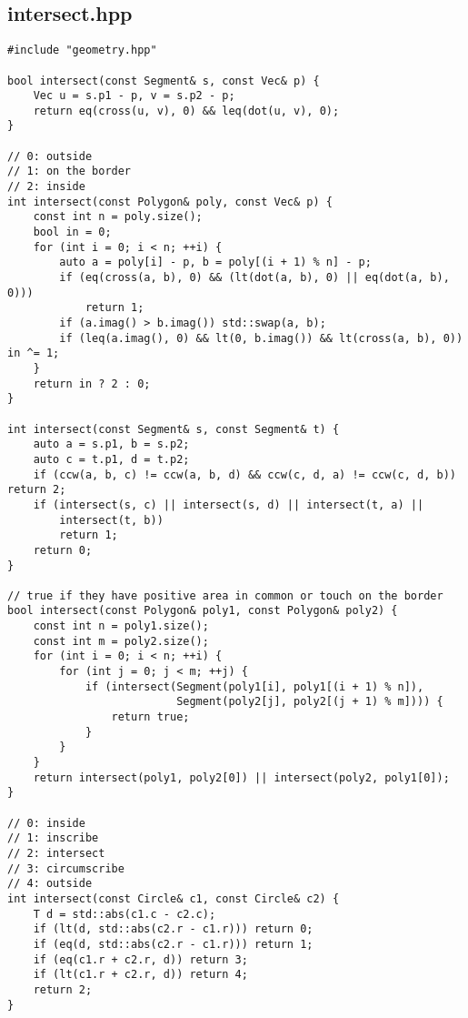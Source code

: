 \subsection{intersect.hpp}

\begin{small}
\begin{markdown}

\end{markdown}
\end{small}

\begin{lstlisting}
#include "geometry.hpp"

bool intersect(const Segment& s, const Vec& p) {
    Vec u = s.p1 - p, v = s.p2 - p;
    return eq(cross(u, v), 0) && leq(dot(u, v), 0);
}

// 0: outside
// 1: on the border
// 2: inside
int intersect(const Polygon& poly, const Vec& p) {
    const int n = poly.size();
    bool in = 0;
    for (int i = 0; i < n; ++i) {
        auto a = poly[i] - p, b = poly[(i + 1) % n] - p;
        if (eq(cross(a, b), 0) && (lt(dot(a, b), 0) || eq(dot(a, b), 0)))
            return 1;
        if (a.imag() > b.imag()) std::swap(a, b);
        if (leq(a.imag(), 0) && lt(0, b.imag()) && lt(cross(a, b), 0)) in ^= 1;
    }
    return in ? 2 : 0;
}

int intersect(const Segment& s, const Segment& t) {
    auto a = s.p1, b = s.p2;
    auto c = t.p1, d = t.p2;
    if (ccw(a, b, c) != ccw(a, b, d) && ccw(c, d, a) != ccw(c, d, b)) return 2;
    if (intersect(s, c) || intersect(s, d) || intersect(t, a) ||
        intersect(t, b))
        return 1;
    return 0;
}

// true if they have positive area in common or touch on the border
bool intersect(const Polygon& poly1, const Polygon& poly2) {
    const int n = poly1.size();
    const int m = poly2.size();
    for (int i = 0; i < n; ++i) {
        for (int j = 0; j < m; ++j) {
            if (intersect(Segment(poly1[i], poly1[(i + 1) % n]),
                          Segment(poly2[j], poly2[(j + 1) % m]))) {
                return true;
            }
        }
    }
    return intersect(poly1, poly2[0]) || intersect(poly2, poly1[0]);
}

// 0: inside
// 1: inscribe
// 2: intersect
// 3: circumscribe
// 4: outside
int intersect(const Circle& c1, const Circle& c2) {
    T d = std::abs(c1.c - c2.c);
    if (lt(d, std::abs(c2.r - c1.r))) return 0;
    if (eq(d, std::abs(c2.r - c1.r))) return 1;
    if (eq(c1.r + c2.r, d)) return 3;
    if (lt(c1.r + c2.r, d)) return 4;
    return 2;
}
\end{lstlisting}

